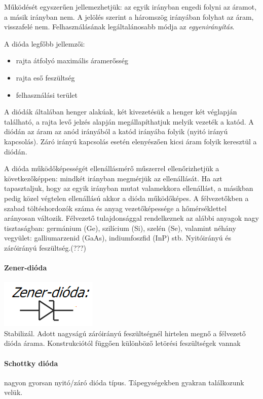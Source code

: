 Működését egyszerűen jellemezhetjük: az egyik irányban engedi folyni az áramot, a másik irányban nem. A jelölés szerint a háromszög irányában folyhat az áram, visszafelé nem. Felhasználásának legáltalánosabb módja az \emph{egyenirányítás}.

A dióda legfőbb jellemzői:
\begin{itemize}[nosep]
	\item rajta átfolyó maximális áramerősség
	\item rajta eső feszültség 
	\item felhasználási terület
\end{itemize}
A diódák általában henger alakúak, két kivezetésük a henger két véglapján található, a rajta levő jelzés alapján megállapíthatjuk melyik vezeték a katód. A diódán az áram az anód irányából a katód irányába folyik (nyitó irányú kapcsolás). Záró irányú kapcsolás esetén elenyészően kicsi áram folyik keresztül a diódán.

A dióda működőképességét ellenállásmérő műszerrel ellenőrizhetjük a következőképpen: mindkét irányban megmérjük az ellenállását. Ha azt tapasztaljuk, hogy az egyik irányban mutat valamekkora ellenállást, a másikban pedig közel végtelen ellenállású akkor a dióda működőképes. A félvezetőkben a szabad töltéshordozók száma és anyag vezetőképessége a hőmérséklettel arányosan változik. Félvezető tulajdonsággal rendelkeznek az alábbi anyagok nagy tisztaságban: germánium (Ge), szilícium (Si), szelén (Se), valamint néhány vegyület: galliumarzenid (GaAs), indiumfoszfid (InP) stb. Nyitóirányú és záróirányú feszültség.(???)%

\paragraph{Zener-dióda}
\includegraphics[width=0.2\linewidth]{fig/10-zener-diode}\\
Stabilizál. Adott nagyságú záróirányú feszültségnél hirtelen megnő a félvezető dióda árama. Konstrukciótól függően különböző letörési feszültségek vannak
\paragraph{Schottky dióda} nagyon gyorsan nyitó/záró dióda típus. Tápegységekben gyakran találkozunk velük.

